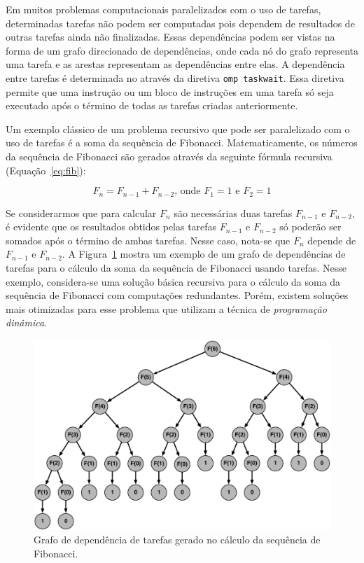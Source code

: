\documentclass{SBCbookchapter}
\begin{document}
	Em muitos problemas computacionais paralelizados com o uso de
	tarefas, determinadas tarefas não podem ser computadas pois dependem
	de resultados de outras tarefas ainda não finalizadas. Essas
	dependências podem ser vistas na forma de um grafo direcionado de
	dependências, onde cada nó do grafo representa uma tarefa e as
	arestas representam as dependências entre elas. A dependência entre
	tarefas é determinada no \openmp através da diretiva \texttt{omp
	taskwait}. Essa diretiva permite que uma instrução ou um bloco de
	instruções em uma tarefa só seja executado após o término de todas
	as tarefas criadas anteriormente.
	
	Um exemplo clássico de um problema recursivo que pode ser
	paralelizado com o uso de tarefas é a soma da sequência de
	Fibonacci. Matematicamente, os números da sequência de Fibonacci são
	gerados através da seguinte fórmula recursiva (Equação~\ref{eq:fib}):
	
	\begin{equation}
		F_n = F_{n-1} + F_{n-2} \text{, onde } F_1=1 \text{ e } F_2=1
		\label{eq:fib}
	\end{equation}

	Se considerarmos que para calcular $F_n$ são necessárias duas
	tarefas $F_{n-1}$ e $F_{n-2}$, é evidente que os resultados obtidos
	pelas tarefas $F_{n-1}$ e $F_{n-2}$ só poderão ser somados após o término
	de ambas tarefas. Nesse caso, nota-se que $F_n$ depende de $F_{n-1}$ e
	$F_{n-2}$. A Figura~\ref{fig:fibonacci} mostra um exemplo de um grafo de dependências
	de tarefas para o cálculo da soma da sequência de Fibonacci usando tarefas.
	Nesse exemplo, considera-se uma solução básica recursiva para o cálculo
	da soma da sequência de Fibonacci com computações redundantes. Porém,
	existem soluções mais otimizadas para esse problema que utilizam a técnica de
	\textit{programação dinâmica}.

	\begin{figure}[t]
		\centering
		\includegraphics[width=0.8\linewidth]{img/fibonacci}
		\caption{Grafo de dependência de tarefas gerado no cálculo da sequência
		de Fibonacci.}\label{fig:fibonacci}
	\end{figure}
\end{document}

